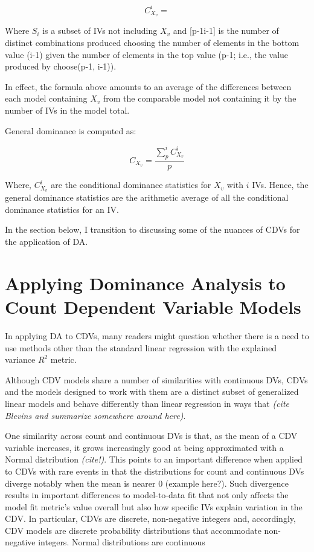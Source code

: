 \documentclass[ShortAfour,times,sageapa]{sagej}
\begin{document}
	\begin{equation}
		C^{i}_{X_v} =
	\end{equation}
	
	Where $S_i$ is a subset of IVs not including $X_v$ and [p-1i-1] is the number of distinct combinations produced choosing the number of elements in the bottom value (i-1) given the number of elements in the top value (p-1; i.e., the value produced by choose(p-1, i-1)).
	
	In effect, the formula above amounts to an average of the differences between each model containing $X_v$ from the comparable model not containing it by the number of IVs in the model total.
	
	General dominance is computed as:
	
	\begin{equation}
		C_{X_v} = \frac{\sum_{p}^{i} C^{i}_{X_v}}{p}
	\end{equation}
	
	Where, $C^{i}_{X_v}$ are the conditional dominance statistics for $X_v$ with $i$ IVs. 
	Hence, the general dominance statistics are the arithmetic average of all the conditional dominance statistics for an IV.
	
	In the section below, I transition to discussing some of the nuances of CDVs for the application of DA.
	
\section{Applying Dominance Analysis to Count Dependent Variable Models}

	In applying DA to CDVs, many readers might question whether there is a need to use methods other than the standard linear regression with the explained variance $R^2$ metric.
	
	
	Although CDV models share a number of similarities with continuous DVs, CDVs and the models designed to work with them are a distinct subset of generalized linear models and behave differently than linear regression in ways that  \emph{(cite Blevins and summarize somewhere around here)}.
	
	One similarity across count and continuous DVs is that, as the mean of a CDV variable increases, it grows increasingly good at being approximated with a Normal distribution \emph{(cite!)}.  
	This points to an important difference when applied to CDVs with rare events in that the distributions for count and continuous DVs diverge notably when the mean is nearer 0 (example here?).  
	Such divergence results in important differences to model-to-data fit that not only affects the model fit metric's value overall but also how specific IVs explain variation in the CDV.  
	In particular, CDVs are discrete, non-negative integers and, accordingly, CDV models are discrete probability distributions that accommodate non-negative integers.  
	Normal distributions are continuous
	
\end{document}
